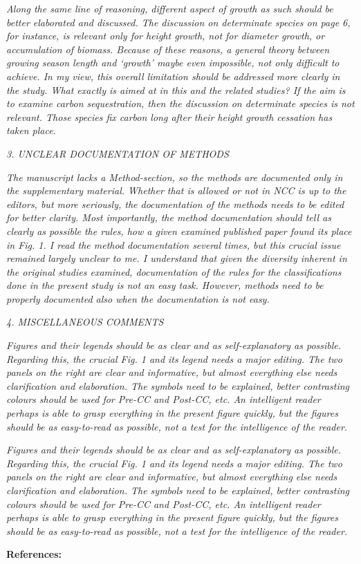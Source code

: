 \documentclass[11pt]{article}
\begin{document}
\emph{Along the same line of reasoning, different aspect of growth as such should be better elaborated and discussed. The discussion on determinate species on page 6, for instance, is relevant only for height growth, not for diameter growth, or accumulation of biomass. Because of these reasons, a general theory between growing season length and ‘growth’ maybe even impossible, not only difficult to achieve. In my view, this overall limitation should be addressed more clearly in the study. What exactly is aimed at in this and the related studies? If the aim is to examine carbon sequestration, then the discussion on determinate species is not relevant. Those species fix carbon long after their height growth cessation has taken place.}

\emph{3. UNCLEAR DOCUMENTATION OF METHODS}

\emph{The manuscript lacks a Method-section, so the methods are documented only in the supplementary material. Whether that is allowed or not in NCC is up to the editors, but more seriously, the documentation of the methods needs to be edited for better clarity. Most importantly, the method documentation should tell as clearly as possible the rules, how a given examined published paper found its place in Fig. 1. I read the method documentation several times, but this crucial issue remained largely unclear to me. I understand that given the diversity inherent in the original studies examined, documentation of the rules for the classifications done in the present study is not an easy task. However, methods need to be properly documented also when the documentation is not easy.}


\emph{4. MISCELLANEOUS COMMENTS}

\emph{Figures and their legends should be as clear and as self-explanatory as possible. Regarding this, the crucial Fig. 1 and its legend needs a major editing. The two panels on the right are clear and informative, but almost everything else needs clarification and elaboration. The symbols need to be explained, better contrasting colours should be used for Pre-CC and Post-CC, etc. An intelligent reader perhaps is able to grasp everything in the present figure quickly, but the figures should be as easy-to-read as possible, not a test for the intelligence of the reader.}

\emph{Figures and their legends should be as clear and as self-explanatory as possible. Regarding this, the crucial Fig. 1 and its legend needs a major editing. The two panels on the right are clear and informative, but almost everything else needs clarification and elaboration. The symbols need to be explained, better contrasting colours should be used for Pre-CC and Post-CC, etc. An intelligent reader perhaps is able to grasp everything in the present figure quickly, but the figures should be as easy-to-read as possible, not a test for the intelligence of the reader.}

\newpage
{\bf References:}

\end{document}
